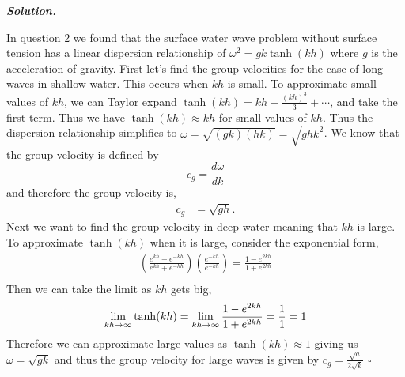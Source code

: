 \documentclass[12pt]{report}
\newenvironment{solution}[1][\it{Solution}]{\textbf{#1. } }{$\square$}
\begin{document}
\begin{solution}
    
    
    \noindent
    In question 2 we found that the surface water wave problem without surface
    tension has a linear dispersion relationship of $\omega^2=gk\tanh(kh)$ where $g$ is the acceleration of gravity. First let's find the group velocities for the case of long waves in shallow water. This occurs when $kh$ is small. To approximate small values of $kh$, we can Taylor expand $\tanh(kh) = kh - \frac{(kh)^3}{3} + \cdots$, and take the first term. Thus we have $\tanh(kh) \approx kh$ for small values of $kh$. Thus the dispersion relationship simplifies to $\omega = \sqrt{(gk)(hk)} = \sqrt{ghk^2}$. We know that the group velocity is defined by \[c_g = \frac{d\omega}{dk}\] and therefore the group velocity is,
    \begin{align*}
        c_g &= \sqrt{gh}.
    \end{align*} 
    Next we want to find the group velocity in deep water meaning that $kh$ is large. To approximate $\tanh(kh)$ when it is large, consider the exponential form,
    \begin{align*}
        \left( \frac{e^{kh} - e^{-kh}}{e^{kh} + e^{-kh}} \right) \left( \frac{e^{-kh}}{e^{-kh}}\right) = \frac{1-e^{2kh}}{1+e^{2kh}}\\
    \end{align*}
    Then we can take the limit as $kh$ gets big,
    \[
        \lim_{kh \rightarrow \infty} \tanh(kh) = \lim_{kh \rightarrow \infty} \frac{1 - e^{2kh}}{1 + e^{2kh}} = \frac{1}{1} = 1\\
    \]
    Therefore we can approximate large values  as $\tanh(kh) \approx 1$ giving us $\omega = \sqrt{gk}$ and thus the group velocity for large waves is given by $c_g = \frac{\sqrt{a}}{2\sqrt{k}}$
\end{solution}

\newpage


\end{document}
